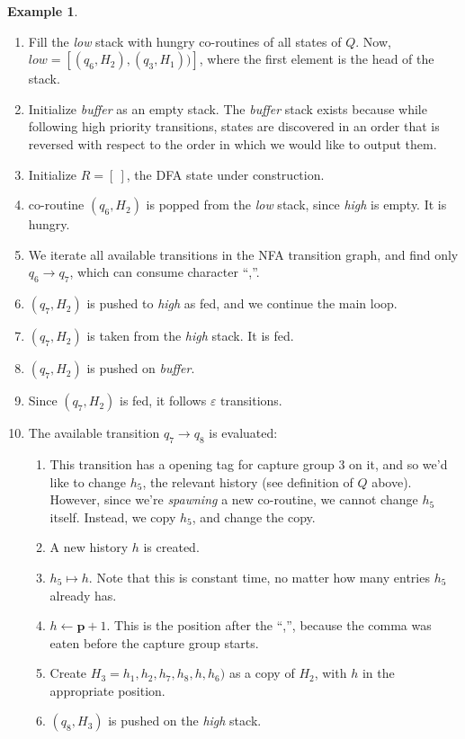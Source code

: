 \documentclass[english,twocolumn]{article}
\theoremstyle{definition}
\newtheorem{example}{Example}[section]
\newcommand{\pos}{\mathbf{\mathbf{p}}}
\begin{document}
\begin{example}
\begin{enumerate}
\item Fill the \emph{low} stack with hungry co-routines of all states of $Q$.
Now, $\mathit{low}=[(q_6, H_2), (q_3, H_1))]$, where the first element is the head of the stack.
\item Initialize \emph{buffer} as an empty stack. 
The \emph{buffer} stack exists because while following high priority transitions, states are discovered
in an order that is reversed with respect to the order in which we would like to output them.
\item Initialize $R=[\ ]$, the DFA state under construction.
\item co-routine $(q_6,H_2)$ is popped from the \emph{low} stack, since \emph{high} is empty. It is hungry.
\item We iterate all available transitions in the NFA transition graph, and find only $q_6\rightarrow q_7$, which can consume character ``,''.
\item $(q_7, H_2)$ is pushed to \emph{high} as fed, and we continue the main loop.
\item $(q_7, H_2)$ is taken from the \emph{high} stack. It is fed.
\item $(q_7, H_2)$ is pushed on \emph{buffer}.
\item Since $(q_7, H_2)$ is fed, it follows $\varepsilon$ transitions.
\item The available transition $q_7\rightarrow q_8$ is evaluated:\begin{enumerate}
	\item 	This transition has a opening tag for capture group 3 on it, and so we'd like to change $h_5$, 
		the relevant history (see definition of $Q$ above). However, since we're \emph{spawning} a new co-routine, we cannot change $h_5$ itself.
		Instead, we copy $h_5$, and change the copy.
	\item	A new history $h$ is created.
	\item 	$h_5 \mapsto h$. Note that this is constant time, no matter how many entries $h_5$ already has.
	\item 	$h\leftarrow\pos+1$. This is the position after the ``,'', because the comma was eaten before the capture
			group starts.
	\item	Create $H_3 = h_1, h_2, h_7, h_8, h, h_6)$ as a copy of $H_2$, with $h$ in the appropriate position.
	\item $(q_8, H_3)$ is pushed on the \emph{high} stack.
\end{enumerate}

\end{enumerate}
\end{example}
\end{document}
